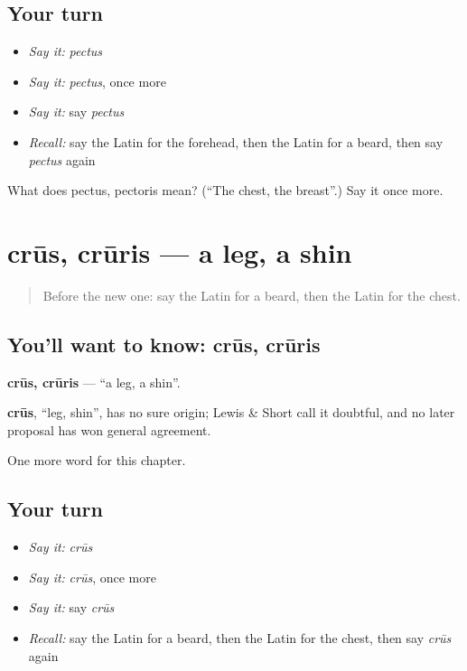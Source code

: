 \subsection*{Your turn}
\begin{itemize}
\raggedright
  \item \emph{Say it:} \emph{pectus}
  \item \emph{Say it:} \emph{pectus}, once more
  \item \emph{Say it:} say \emph{pectus}
  \item \emph{Recall:} say the Latin for the forehead, then the Latin for a beard, then say \emph{pectus} again
\end{itemize}

\begin{tcolorbox}[breakable,colback=teal!4,colframe=teal!35!black,title={Before you move on}]
What does pectus, pectoris mean? (\textquotedblleft{}The chest, the breast\textquotedblright{}.) Say it once more.
\end{tcolorbox}
\section[crūs, crūris]{crūs, crūris — a leg, a shin}

\label{lesson:LA-C66-crus}



\begin{quote}
Before the new one: say the Latin for a beard, then the Latin for the chest.
\end{quote}

\subsection*{You'll want to know: crūs, crūris}
\textbf{crūs, crūris} — \textquotedblleft{}a leg, a shin\textquotedblright{}.

\begin{cousinweb}
\textbf{crūs}, \textquotedblleft{}leg, shin\textquotedblright{}, has no sure origin; Lewis \& Short call it doubtful, and no later proposal has won general agreement.
\end{cousinweb}

\begin{grammarlens}[title={What you've built}]
One more word for this chapter.
\end{grammarlens}

\subsection*{Your turn}
\begin{itemize}
\raggedright
  \item \emph{Say it:} \emph{crūs}
  \item \emph{Say it:} \emph{crūs}, once more
  \item \emph{Say it:} say \emph{crūs}
  \item \emph{Recall:} say the Latin for a beard, then the Latin for the chest, then say \emph{crūs} again
\end{itemize}

